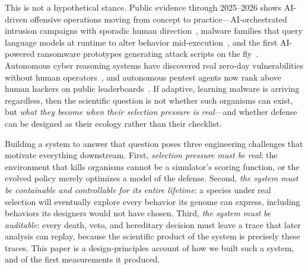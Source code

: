 \documentclass[11pt,a4paper]{article}
\begin{document}
This is not a hypothetical stance. Public evidence through 2025--2026 shows AI-driven offensive operations moving from concept to practice---AI-orchestrated intrusion campaigns with sporadic human direction~\cite{anthropic2025espionage}, malware families that query language models at runtime to alter behavior mid-execution~\cite{gtig2025ai}, and the first AI-powered ransomware prototypes generating attack scripts on the fly~\cite{eset2025promptlock}. Autonomous cyber reasoning systems have discovered real zero-day vulnerabilities without human operators~\cite{aixcc2025}, and autonomous pentest agents now rank above human hackers on public leaderboards~\cite{xbow2025}. If adaptive, learning malware is arriving regardless, then the scientific question is not whether such organisms can exist, but \emph{what they become when their selection pressure is real}---and whether defense can be designed as their ecology rather than their checklist.

Building a system to answer that question poses three engineering challenges that motivate everything downstream. First, \emph{selection pressure must be real}: the environment that kills organisms cannot be a simulator's scoring function, or the evolved policy merely optimizes a model of the defense. Second, \emph{the system must be containable and controllable for its entire lifetime}: a species under real selection will eventually explore every behavior its genome can express, including behaviors its designers would not have chosen. Third, \emph{the system must be auditable}: every death, veto, and hereditary decision must leave a trace that later analysis can replay, because the scientific product of the system is precisely these traces. This paper is a design-principles account of how we built such a system, and of the first measurements it produced.
\end{document}
